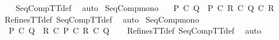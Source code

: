 \begin{isabellebody}
%
\isadelimproof
\ \ %
\endisadelimproof
%
\isatagproof
{}\isamarkupfalse%
\ SeqCompTT{\isacharunderscore}def\ \isamarkupfalse%
\ auto%
\endisatagproof
{\isafoldproof}%
%
\isadelimproof
\isanewline
%
\endisadelimproof
\isanewline
{}\isamarkupfalse%
\ SeqComp{\isacharunderscore}mono{}{\isacharcolon}\ \isanewline
\ \ {\isachardoublequoteopen}P\ {\isasymsqsubseteq}\isactrlsub C\ Q\ {\isasymLongrightarrow}\ P\ {\isacharsemicolon}\isactrlsub C\ R\ {\isasymsqsubseteq}\isactrlsub C\ Q\ {\isacharsemicolon}\isactrlsub C\ R{\isachardoublequoteclose}\isanewline
%
\isadelimproof
\ \ %
\endisadelimproof
%
\isatagproof
{}\isamarkupfalse%
\ RefinesTT{\isacharunderscore}def\ SeqCompTT{\isacharunderscore}def\ \isamarkupfalse%
\ auto%
\endisatagproof
{\isafoldproof}%
%
\isadelimproof
\isanewline
%
\endisadelimproof
\isanewline
{}\isamarkupfalse%
\ SeqComp{\isacharunderscore}mono{}{\isacharcolon}\ \isanewline
\ \ {\isachardoublequoteopen}P\ {\isasymsqsubseteq}\isactrlsub C\ Q\ {\isasymLongrightarrow}\ R\ {\isacharsemicolon}\isactrlsub C\ P\ {\isasymsqsubseteq}\isactrlsub C\ R\ {\isacharsemicolon}\isactrlsub C\ Q{\isachardoublequoteclose}\isanewline
%
\isadelimproof
\ \ %
\endisadelimproof
%
\isatagproof
{}\isamarkupfalse%
\ RefinesTT{\isacharunderscore}def\ SeqCompTT{\isacharunderscore}def\ \isamarkupfalse%
\ auto%
\endisatagproof
{\isafoldproof}%
%
\isadelimproof
\isanewline
%
\endisadelimproof
%
\isadelimtheory
\isanewline
%
\endisadelimtheory
%
\isatagtheory
{}\isamarkupfalse%
%
\endisatagtheory
{\isafoldtheory}%
%
\isadelimtheory
%
\endisadelimtheory
%
\end{isabellebody}%
\endinput
